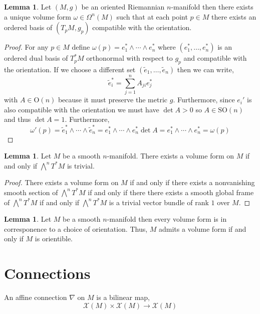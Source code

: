 \documentclass[12pt]{extarticle}
\theoremstyle{definition}
\newtheorem{lemma}[theorem]{Lemma}
\newenvironment{definition}[1][Definition:]{\begin{trivlist}
\item[\hskip \labelsep {\bfseries #1}]}{\end{trivlist}}
\newcommand{\Orth}[1]{\mathrm{O}\left(#1\right)}
\newcommand{\SO}[1]{\mathrm{SO}\left(#1\right)}
\begin{document}
\begin{lemma}
Let $(M, g)$ be an oriented Riemannian $n$-manifold then there exists a unique volume form $\omega \in \Omega^n(M)$ such that at each point $p \in M$ there exists an ordered basis of $(T_p M, g_p)$ compatible with the orientation.
\end{lemma}


\begin{proof}
For any $p \in M$ define $\omega(p) = e_1^* \wedge \cdots \wedge e_n^* $ where $(e_1^*, \dots, e_n^*)$ is an ordered dual basis of $T_p^*M$ orthonormal with respect to $g_p$ and compatible with the orientation. If we choose a different set $(\tilde{e}_1, \dots, \tilde{e}_n)$ then we can write,
\[ \tilde{e}_i^* = \sum_{j = 1}^n A_{ji} e_j^* \]
with $A \in \Orth{n}$ because it must preserve the metric $g$. Furthermore, since $e_i'$ is also compatible with the orientation we must have $\det{A} > 0$ so $A \in \SO{n}$ and thus $\det{A} = 1$. Furthermore,
\[ \omega'(p) = \tilde{e}_1^* \wedge \cdots \wedge \tilde{e}_n^* = e_1^* \wedge \cdots \wedge e_n^* \det{A} = e_1^* \wedge \cdots \wedge e_n^* = \omega(p) \]
\end{proof}

\begin{lemma}
Let $M$ be a smooth $n$-manifold. There exists a volume form on $M$ if and only if $\bigwedge^n T^* M$ is trivial.
\end{lemma}

\begin{proof}
There exists a volume form on $M$ if and only if there exists a nonvanishing smooth section of $\bigwedge^n T^* M$ if and only if there there exists a smooth global frame of $\bigwedge^n T^* M$ if and only if $\bigwedge^n T^* M$ is a trivial vector bundle of rank $1$ over $M$. 
\end{proof}

\begin{lemma}
Let $M$ be a smooth $n$-manifold then every volume form is in corresponence to a choice of orientation. Thus, $M$ admits a volume form if and only if $M$ is orientible. 
\end{lemma}

\section{Connections}

\begin{definition}
An affine connection $\nabla$ on $M$ is a bilinear map,
\[ \mathscr{X}(M) \times \mathscr{X}(M) \to \mathscr{X}(M) \]
\end{definition}
\end{document}
